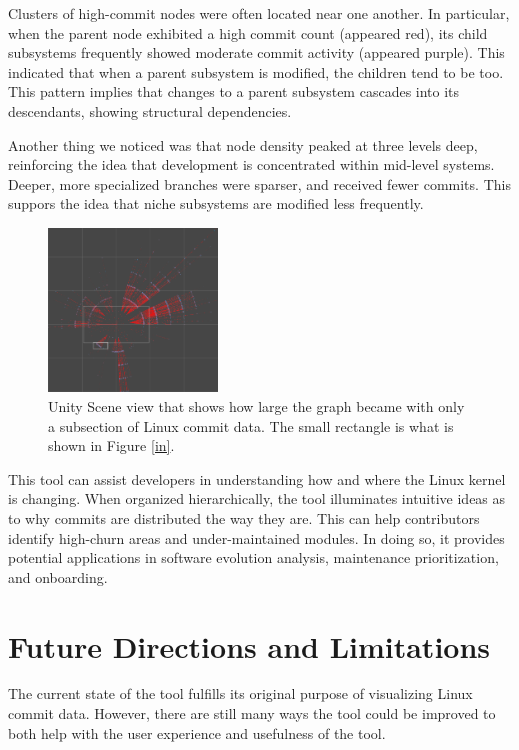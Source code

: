 \documentclass[conference]{IEEEtran}
\begin{document}
 Clusters of high-commit nodes were often located near one another. In particular, when the parent node exhibited a high commit count (appeared red), its child subsystems frequently showed moderate commit activity (appeared purple). This indicated that when a parent subsystem is modified, the children tend to be too. This pattern implies that changes to a parent subsystem cascades into its descendants, showing structural dependencies.

Another thing we noticed was that node density peaked at three levels deep, reinforcing the idea that development is concentrated within mid-level systems. Deeper, more specialized branches were sparser, and received fewer commits. This suppors the idea that niche subsystems are modified less frequently.

\begin{figure}[h!]
	\centering
	\includegraphics[width=0.4\textwidth]{wholeThingMostly.png}
	\caption{Unity Scene view that shows how large the graph became with only a subsection of Linux commit data. The small rectangle is what is shown in Figure \ref{in}.}
	\label{out}
\end{figure}

This tool can assist developers in understanding how and where the Linux kernel is changing. When organized hierarchically, the tool illuminates intuitive ideas as to why commits are distributed the way they are. This can help contributors identify high-churn areas and under-maintained modules. In doing so, it provides potential applications in software evolution analysis, maintenance prioritization, and onboarding.



\section{Future Directions and Limitations}
\label{futDir}

The current state of the tool fulfills its original purpose of visualizing Linux commit data. However, there are still many ways the tool could be improved to both help with the user experience and usefulness of the tool.
\end{document}
